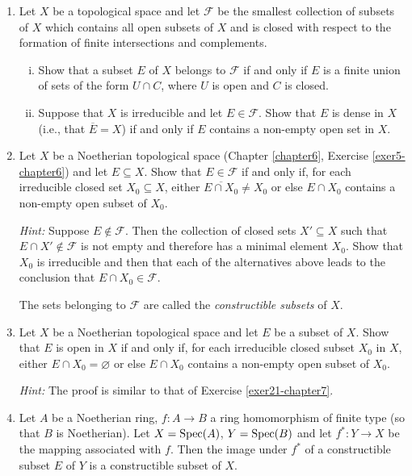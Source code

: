 \begin{enumerate}
    \item \label{exer20-chapter7}Let $X$ be a topological space and let $\mathcal{F}$ be the smallest collection of subsets of $X$ which contains all open subsets of $X$ and is closed with respect to the formation of finite intersections and complements.
    \begin{enumerate}[i)]
        \item Show that a subset $E$ of $X$ belongs to $\mathcal{F}$ if and only if $E$ is a finite union of sets of the form $U \cap C$, where $U$ is open and $C$ is closed.
        \item Suppose that $X$ is irreducible and let $E \in \mathcal{F}$. Show that $E$ is dense in $X$ (i.e., that $\overline{E} = X$) if and only if $E$ contains a non-empty open set in $X$.
    \end{enumerate}

    \item \label{exer21-chapter7}Let $X$ be a Noetherian topological space (Chapter \ref{chapter6}, Exercise \ref{exer5-chapter6}) and let $E \subseteq X$. Show that $E \in \mathcal{F}$ if and only if, for each irreducible closed set $X_0 \subseteq X$, either $\overline{E \cap X_0} \neq X_0$ or else $E \cap X_0$ contains a non-empty open subset of $X_0$.
    
    \textit{Hint:} Suppose $E \notin \mathcal{F}$. Then the collection of closed sets $X' \subseteq X$ such that $E \cap X' \notin \mathcal{F}$ is not empty and therefore has a minimal element $X_0$. Show that $X_0$ is irreducible and then that each of the alternatives above leads to the conclusion that $E \cap X_0 \in \mathcal{F}$.

    The sets belonging to $\mathcal{F}$ are called the \emph{constructible subsets} of $X$.

    \item \label{exer22-chapter7}Let $X$ be a Noetherian topological space and let $E$ be a subset of $X$. Show that $E$ is open in $X$ if and only if, for each irreducible closed subset $X_0$ in $X$, either $E \cap X_0 = \varnothing$ or else $E \cap X_0$ contains a non-empty open subset of $X_0$. 
    
    \textit{Hint:} The proof is similar to that of Exercise \ref{exer21-chapter7}.

    \item \label{exer23-chapter7}Let $A$ be a Noetherian ring, $f \colon A \to B$ a ring homomorphism of finite type (so that $B$ is Noetherian). Let $X = \operatorname{Spec}(A)$, $Y = \operatorname{Spec}(B)$ and let $f^* \colon Y \to X$ be the mapping associated with $f$. Then the image under $f^*$ of a constructible subset $E$ of $Y$ is a constructible subset of $X$.


\end{enumerate}
